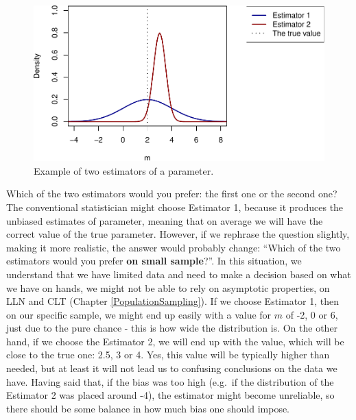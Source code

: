 \documentclass[
]{book}
\theoremstyle{definition}
\theoremstyle{definition}
\theoremstyle{definition}
\theoremstyle{definition}
\theoremstyle{remark}
\begin{document}
\begin{figure}
\centering
\includegraphics{Svetunkov---Statistics-for-Business-Analytics_files/figure-latex/biasVarianceEstimate-1.pdf}
\caption{\label{fig:biasVarianceEstimate}Example of two estimators of a parameter.}
\end{figure}

Which of the two estimators would you prefer: the first one or the second one? The conventional statistician might choose Estimator 1, because it produces the unbiased estimates of parameter, meaning that on average we will have the correct value of the true parameter. However, if we rephrase the question slightly, making it more realistic, the answer would probably change: ``Which of the two estimators would you prefer \textbf{on small sample}?''. In this situation, we understand that we have limited data and need to make a decision based on what we have on hands, we might not be able to rely on asymptotic properties, on LLN and CLT (Chapter \ref{PopulationSampling}). If we choose Estimator 1, then on our specific sample, we might end up easily with a value for \(m\) of -2, 0 or 6, just due to the pure chance - this is how wide the distribution is. On the other hand, if we choose the Estimator 2, we will end up with the value, which will be close to the true one: 2.5, 3 or 4. Yes, this value will be typically higher than needed, but at least it will not lead us to confusing conclusions on the data we have. Having said that, if the bias was too high (e.g.~if the distribution of the Estimator 2 was placed around -4), the estimator might become unreliable, so there should be some balance in how much bias one should impose.
\end{document}
